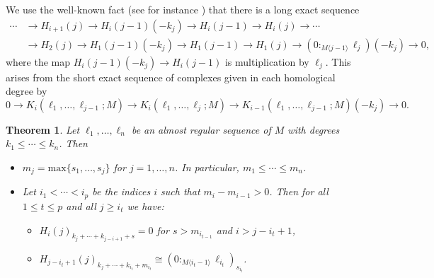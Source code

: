 \documentclass[a4paper, 10pt, reqno, english, ones]{amsart}  %
\newtheorem{theorem}{Theorem}[section]
\theoremstyle{definition}
\theoremstyle{remark}
\begin{document}
We use the well-known fact (see for instance \cite{bruns1993cohen}) that there is a long exact sequence
    \begin{align}\label{eq:LES}
       \cdots &\longrightarrow H_{i+1}(j)\longrightarrow H_i(j-1)(-k_j)\longrightarrow H_i(j-1) \longrightarrow H_i(j)\longrightarrow \cdots\\
       &\longrightarrow H_2(j)\longrightarrow H_1(j-1)(-k_j) \longrightarrow H_1(j-1) \longrightarrow H_1(j) \longrightarrow (0:_{M\langle j-1 \rangle} \ell_j)(-k_j)\longrightarrow 0 \nonumber,
    \end{align}
    where the map $H_i(j-1)(-k_j)\longrightarrow H_i(j-1)$ is multiplication by $\ell_j$. This arises from the short exact sequence of complexes given in each homological degree by
    \[
    0\longrightarrow K_i(\ell_1,\dots,\ell_{j-1};M) \longrightarrow K_i(\ell_1,\dots,\ell_j;M) \longrightarrow K_{i-1}(\ell_1,\dots,\ell_{j-1};M)(-k_j)\longrightarrow 0.
    \]
\begin{theorem}\label{thm:Ext Betti Gen}
    Let $\ell_1,\dots,\ell_n$ be an almost regular sequence of $M$ with degrees $k_1\leq \cdots \leq k_n$. Then
    \begin{itemize}
        \item[(a)] $m_j = \textrm{max}\{ s_1,\dots,s_j\}$ for $j=1,\dots,n$. In particular, $m_1\leq \cdots \leq m_n$.
        \item[(b)] Let $i_1<\cdots<i_p$ be the indices $i$ such that $m_i-m_{i-1} > 0$. Then for all $1\leq t \leq p$ and all $j\geq i_t$ we have:
        \begin{itemize}
            \item[(i)] $H_i(j)_{k_j+\cdots+k_{j-i+1}+s}=0$ for $s>m_{i_{t-1}}$ and $i>j-i_t+1$,
            \item[(ii)] $H_{j-i_t+1}(j)_{k_j+\cdots+ k_{i_t}+m_{i_t}} \cong (0:_{M\langle i_t -1 \rangle} \ell_{i_t})_{s_{i_t}}$.
        \end{itemize}
    \end{itemize}
\end{theorem}
\end{document}
